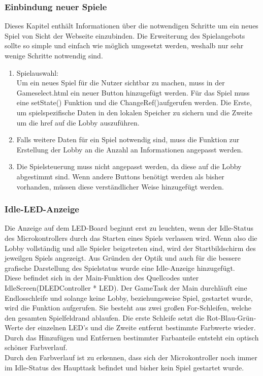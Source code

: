 \documentclass[12pt,a4paper]{article}
\begin{document}
\subsubsection{Einbindung neuer Spiele}
Dieses Kapitel enthält Informationen über die notwendigen Schritte um ein neues Spiel von Sicht der Webseite einzubinden. Die Erweiterung des Spielangebots sollte so simple und einfach wie möglich umgesetzt werden, weshalb nur sehr wenige Schritte notwendig sind.
\begin{enumerate}
\item Spielauswahl: \\
Um ein neues Spiel für die Nutzer sichtbar zu machen, muss in der Gameselect.html ein neuer Button hinzugefügt werden. Für das Spiel muss eine \glqq setState()\grqq{} Funktion und die \glqq ChangeRef()\grqq aufgerufen werden. Die Erste, um spielspezifische Daten in den lokalen Speicher zu sichern und die Zweite um die href auf die Lobby auszuführen. 
\item Falls weitere Daten für ein Spiel notwendig sind, muss die Funktion zur Erstellung der Lobby an die Anzahl an Informationen angepasst werden.
\item Die Spielsteuerung muss nicht angepasst werden, da diese auf die Lobby abgestimmt sind. Wenn andere Buttons benötigt werden als bisher vorhanden, müssen diese verständlicher Weise hinzugefügt werden. 
\end{enumerate}

\subsubsection{Idle-LED-Anzeige}
Die Anzeige auf dem LED-Board beginnt erst zu leuchten, wenn der Idle-Status des Microkontrollers durch das Starten eines Spiels verlassen wird. Wenn also die Lobby vollständig und alle Spieler beigetreten sind, wird der Startbildschirm des jeweilgen Spiels angezeigt. Aus Gründen der Optik und auch für die bessere grafische Darstellung des Spielstatus wurde eine Idle-Anzeige hinzugefügt. 
\vspace{1.5ex}\\
Diese befindet sich in der Main-Funktion des Quellcodes unter \glqq IdleScreen(DLEDController * LED)\grqq{}. Der GameTask der Main durchläuft eine Endlosschleife und solange keine Lobby, beziehungsweise Spiel, gestartet wurde, wird die Funktion aufgerufen. Sie besteht aus zwei großen For-Schleifen, welche den gesamten Spielfeldrand ablaufen. Die erste Schleife setzt die Rot-Blau-Grün-Werte der einzelnen LED's und die Zweite entfernt bestimmte Farbwerte wieder. Durch das Hinzufügen und Entfernen bestimmter Farbanteile entsteht ein optisch schöner Farbverlauf. 
\vspace{1.5ex}\\
Durch den Farbverlauf ist zu erkennen, dass sich der Microkontroller noch immer im Idle-Status des Haupttask befindet und bisher kein Spiel gestartet wurde.
\newpage
\end{document}
